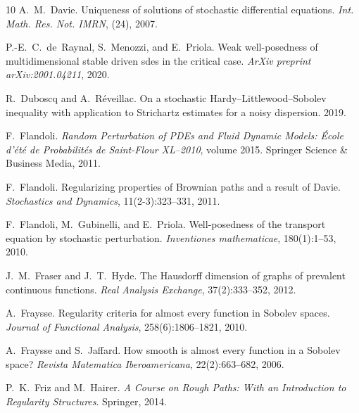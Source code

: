 \documentclass[10pt]{article}
\newcommand{\tmtextit}[1]{{\itshape{#1}}}
\begin{document}
\begin{thebibliography}{10}
  A.~M.~Davie. {\newblock}Uniqueness of solutions of
  stochastic differential equations. {\newblock}\tmtextit{Int. Math. Res. Not.
  IMRN}, (24), 2007.{\newblock}
  
  P.-E.~C.~de~Raynal, S.~Menozzi, and  E.~Priola.
  {\newblock}Weak well-posedness of multidimensional stable driven sdes in the
  critical case. {\newblock}\tmtextit{ArXiv preprint arXiv:2001.04211},
  2020.{\newblock}
  
  R.~Duboscq  and  A.~R{\'e}veillac. {\newblock}On a
  stochastic Hardy--Littlewood--Sobolev inequality with application to
  Strichartz estimates for a noisy dispersion. {\newblock}2019.{\newblock}
  
  F.~Flandoli. {\newblock}\tmtextit{Random Perturbation
  of PDEs and Fluid Dynamic Models: {\'E}cole d'{\'e}t{\'e} de
  Probabilit{\'e}s de Saint-Flour XL--2010},  volume  2015.
  {\newblock}Springer Science \& Business Media, 2011.{\newblock}
  
  F.~Flandoli. {\newblock}Regularizing properties of
  Brownian paths and a result of Davie. {\newblock}\tmtextit{Stochastics and
  Dynamics}, 11(2-3):323--331, 2011.{\newblock}
  
  F.~Flandoli, M.~Gubinelli, and  E.~Priola.
  {\newblock}Well-posedness of the transport equation by stochastic
  perturbation. {\newblock}\tmtextit{Inventiones mathematicae}, 180(1):1--53,
  2010.{\newblock}
  
  J.~M.~Fraser  and  J.~T.~Hyde. {\newblock}The
  Hausdorff dimension of graphs of prevalent continuous functions.
  {\newblock}\tmtextit{Real Analysis Exchange}, 37(2):333--352,
  2012.{\newblock}
  
  A.~Fraysse. {\newblock}Regularity criteria for
  almost every function in Sobolev spaces. {\newblock}\tmtextit{Journal of
  Functional Analysis}, 258(6):1806--1821, 2010.{\newblock}
  
  A.~Fraysse  and  S.~Jaffard. {\newblock}How smooth
  is almost every function in a Sobolev space? {\newblock}\tmtextit{Revista
  Matematica Iberoamericana}, 22(2):663--682, 2006.{\newblock}
  
  P.~K.~Friz  and  M.~Hairer. {\newblock}\tmtextit{A
  Course on Rough Paths: With an Introduction to Regularity Structures}.
  {\newblock}Springer, 2014.{\newblock}
  

\end{thebibliography}
\end{document}
